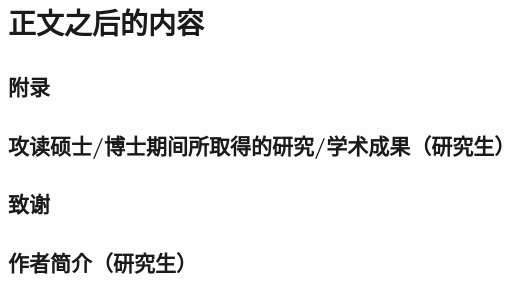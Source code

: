 	\section{正文之后的内容}
		\subsection{附录}
		\subsection{攻读硕士\slash 博士期间所取得的研究\slash 学术成果（研究生）}
		\subsection{致谢}
		\subsection{作者简介（研究生）}
		